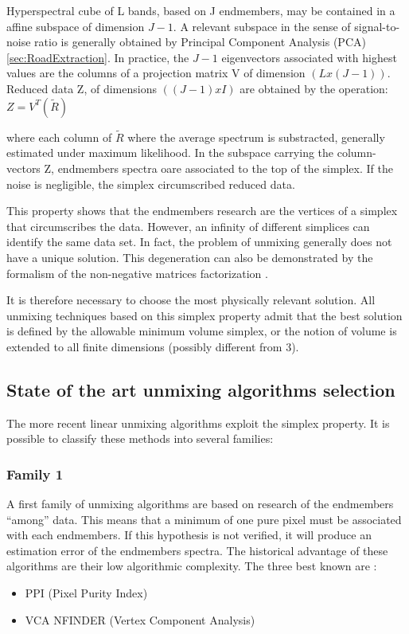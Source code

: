 Hyperspectral cube of L bands, based on J endmembers,
may be contained in a affine subspace of dimension $J-1$.
A relevant subspace in the sense of signal-to-noise ratio is
generally obtained by Principal Component Analysis (PCA) \ref{sec:RoadExtraction}. 
In practice, the $J-1$ eigenvectors associated with highest values are
the columns of a projection matrix V of dimension $(Lx(J-1))$. Reduced
data Z, of dimensions $((J-1)xI)$ are obtained by the operation:
$Z=V^{T}(\tilde{R})$

where each column of $\tilde{R}$ where the average spectrum is substracted,
generally estimated under maximum likelihood. In the
subspace carrying the column-vectors Z, endmembers spectra oare associated to the top of the simplex. If the noise is
negligible, the simplex circumscribed reduced data.

This property shows that the endmembers research are the vertices of a
simplex that circumscribes the data. However, an infinity of different
simplices can identify the same data set. In fact, the problem of
unmixing generally does not have a unique solution. This degeneration can also be
demonstrated by the formalism of the non-negative
matrices factorization \cite{Huck2010a}.

It is therefore necessary to choose the most physically
relevant solution. All unmixing techniques based on this simplex property admit that the best solution is defined by the allowable
minimum volume simplex, or the notion of volume is extended to all
finite dimensions (possibly different from 3).
  

\subsection{State of the art unmixing algorithms selection} 
The more recent linear unmixing algorithms exploit the
simplex property. It is possible to classify these methods into several families:

\subsubsection{Family 1} 
A first family of unmixing algorithms are based on research of the
endmembers ``among'' data. This means that a minimum of one pure pixel must
be associated with each endmembers. If this hypothesis is not
verified, it will produce an estimation error of the endmembers spectra. The historical advantage of these algorithms are their low
algorithmic complexity. The three best known are :
\begin{itemize}
\item PPI (Pixel Purity Index)
\item VCA NFINDER (Vertex Component Analysis) \cite{Nascimento2005}
\end{itemize}

